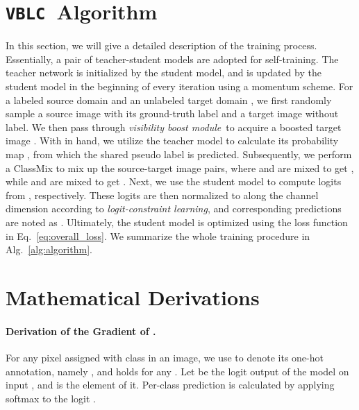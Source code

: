 \documentclass[letterpaper]{article} \usepackage{aaai23}  \usepackage{times}  \usepackage{helvet}  \usepackage{courier}  \usepackage[hyphens]{url}  \usepackage{graphicx} \urlstyle{rm} \def\UrlFont{\rm}  \usepackage{natbib}  \usepackage{caption} \frenchspacing  \setlength{\pdfpagewidth}{8.5in}  \setlength{\pdfpageheight}{11in}  \usepackage{algorithm}
\newcommand{\method}{\texttt{VBLC}~}
\newcommand{\boostModuleName}{\textit{visibility boost module}}
\newcommand{\lossModuleName}{\textit{logit-constraint learning}}
\begin{document}
\section{\method Algorithm}
\label{sec:alg}
In this section, we will give a detailed description of the training process. Essentially, a pair of teacher-student models are adopted for self-training. The teacher network is initialized by the student model, and is updated by the student model in the beginning of every iteration using a momentum scheme. For a labeled source domain  and an unlabeled target domain , we first randomly sample a source image  with its ground-truth label  and a target image  without label. We then pass  through \boostModuleName~to acquire a boosted target image . With  in hand, we utilize the teacher model  to calculate its probability map , from which the shared pseudo label  is predicted. Subsequently, we perform a ClassMix to mix up the source-target image pairs, where  and  are mixed to get , while  and  are mixed to get . Next, we use the student model  to compute logits  from , respectively. These logits are then normalized to  along the channel dimension according to \lossModuleName, and corresponding predictions are noted as . Ultimately, the student model is optimized using the loss function in Eq.~\eqref{eq:overall_loss}.
We summarize the whole training procedure in Alg.~\ref{alg:algorithm}. 

\section{Mathematical Derivations}
\label{sec:proof}

\allowdisplaybreaks

\newcommand{\znorm}{{\Vert z\Vert}}
\newcommand{\zdiv}[1]{{z_{#1}/\znorm}}
\newcommand{\zdivf}[1]{{\frac{z_{#1}}{\znorm}}}
\newcommand{\ksum}[1][k]{{\sum_{{#1}=1}^K\ }}
\newcommand{\softmax}[3][k]{{\frac{e^{#2}}{\ksum[#1] e^{#3}}}}
\newcommand{\partialf}[2]{{}\frac{\partial {#1}}{\partial {#2}}}
\newcommand{\p}[2][*]{{p_{#2}^{#1}}}


\paragraph{Derivation of the Gradient of .}
For any pixel  assigned with class  in an image, we use  to denote its one-hot annotation, namely , and  holds for any . Let  be the logit output of the model on input , and  is the  element of it. Per-class prediction  is calculated by applying softmax to the logit . 
\end{document}
